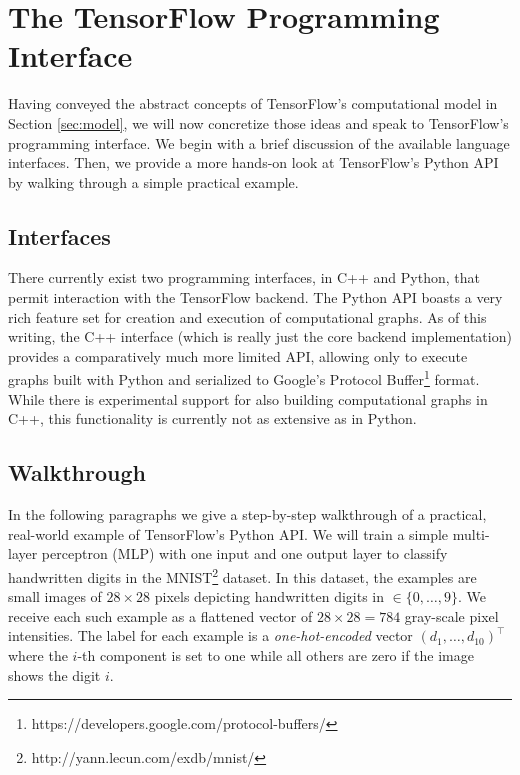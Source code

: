 \section{The TensorFlow Programming Interface}\label{sec:code}

Having conveyed the abstract concepts of TensorFlow's computational model in
Section \ref{sec:model}, we will now concretize those ideas and speak to
TensorFlow's programming interface. We begin with a brief discussion of the
available language interfaces. Then, we provide a more hands-on look at
TensorFlow's Python API by walking through a simple practical example.

\subsection{Interfaces}\label{sec:code-interfaces}

There currently exist two programming interfaces, in C++ and Python, that permit
interaction with the TensorFlow backend. The Python API boasts a very rich
feature set for creation and execution of computational graphs. As of this
writing, the C++ interface (which is really just the core backend
implementation) provides a comparatively much more limited API, allowing only to
execute graphs built with Python and serialized to Google's Protocol
Buffer\footnote{https://developers.google.com/protocol-buffers/} format. While
there is experimental support for also building computational graphs in C++,
this functionality is currently not as extensive as in Python.

\subsection{Walkthrough}\label{sec:code-walk}

In the following paragraphs we give a step-by-step walkthrough of a practical,
real-world example of TensorFlow's Python API. We will train a simple
multi-layer perceptron (MLP) with one input and one output layer to classify
handwritten digits in the MNIST\footnote{http://yann.lecun.com/exdb/mnist/}
dataset. In this dataset, the examples are small images of $28 \times 28$ pixels
depicting handwritten digits in $\in \{0, \dots, 9\}$. We receive each such
example as a flattened vector of $28 \times 28 = 784$ gray-scale pixel
intensities. The label for each example is a \emph{one-hot-encoded} vector
$(d_1, \dots, d_{10})^\top$ where the $i$-th component is set to one while all
others are zero if the image shows the digit $i$.

